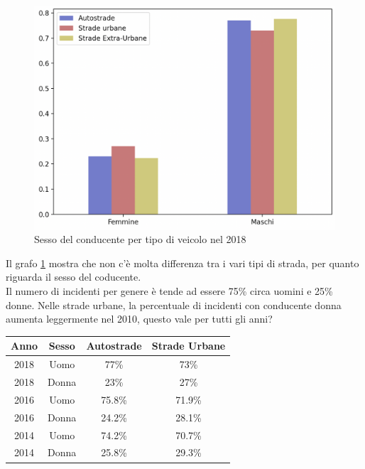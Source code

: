 \documentclass[a4paper]{report}
\begin{document}
\begin{figure}
    \includegraphics[width=\linewidth]{../src/incidenti/incidenti_senza_coords/tipo_veicoli/uomo-donna.png}
    \caption{Sesso del conducente per tipo di veicolo nel 2018}
    \label{fig:differenza-uomo-donna}
\end{figure}

Il grafo \ref{fig:differenza-uomo-donna} mostra che non c'è molta differenza tra i vari tipi di 
strada, per quanto riguarda il sesso del coducente.\\
Il numero di incidenti per genere è tende ad essere 75\% circa uomini e 25\% donne.
Nelle strade  urbane, la percentuale di incidenti con conducente donna aumenta leggermente nel 2010, 
questo vale per tutti gli anni?

\begin{center}
    \def\arraystretch{1.5}%
    \begin{tabular}{ |c|c|c|c| }
        \hline
        Anno & Sesso & Autostrade & Strade Urbane \\ 
        \hline
        \rowcolor{TableGray}
        2018 & Uomo & 77\%  & 73\% \\
        2018 & Donna & 23\% & 27\% \\
        \rowcolor{TableGray}
        2016 & Uomo & 75.8\%  & 71.9\% \\
        2016 & Donna & 24.2\% & 28.1\% \\
        \rowcolor{TableGray}
        2014 & Uomo & 74.2\%  & 70.7\% \\
        2014 & Donna & 25.8\% & 29.3\% \\
        \hline
    \end{tabular}
\end{center}
\end{document}
